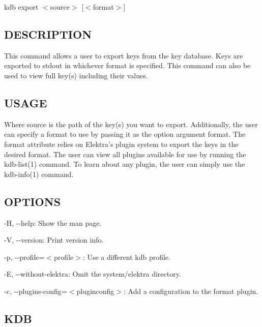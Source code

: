 {\ttfamily kdb export $<$source$>$ \mbox{[}$<$format$>$\mbox{]}}

\subsection*{D\+E\+S\+C\+R\+I\+P\+T\+I\+O\+N}

This command allows a user to export keys from the key database. Keys are exported to {\ttfamily stdout} in whichever format is specified. This command can also be used to view full key(s) including their values.

\subsection*{U\+S\+A\+G\+E}

Where {\ttfamily source} is the path of the key(s) you want to export. Additionally, the user can specify a format to use by passing it as the option argument {\ttfamily format}. The {\ttfamily format} attribute relies on Elektra's plugin system to export the keys in the desired format. The user can view all plugins available for use by running the kdb-\/list(1) command. To learn about any plugin, the user can simply use the kdb-\/info(1) command.

\subsection*{O\+P\+T\+I\+O\+N\+S}


\begin{DoxyItemize}
\item {\ttfamily -\/\+H}, {\ttfamily -\/-\/help}\+: Show the man page.
\item {\ttfamily -\/\+V}, {\ttfamily -\/-\/version}\+: Print version info.
\item {\ttfamily -\/p}, {\ttfamily -\/-\/profile}=$<$profile$>$\+: Use a different kdb profile.
\item {\ttfamily -\/\+E}, {\ttfamily -\/-\/without-\/elektra}\+: Omit the {\ttfamily system/elektra} directory.
\item {\ttfamily -\/c}, {\ttfamily -\/-\/plugins-\/config}=$<$pluginconfig$>$\+: Add a configuration to the format plugin.
\end{DoxyItemize}

\subsection*{K\+D\+B}


